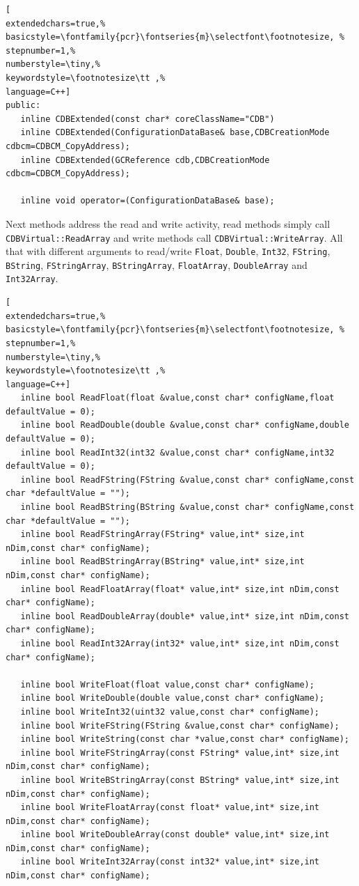 \begin{lstlisting}[
extendedchars=true,%
basicstyle=\fontfamily{pcr}\fontseries{m}\selectfont\footnotesize, %
stepnumber=1,%
numberstyle=\tiny,%
keywordstyle=\footnotesize\tt ,%
language=C++]
public:
   inline CDBExtended(const char* coreClassName="CDB")
   inline CDBExtended(ConfigurationDataBase& base,CDBCreationMode cdbcm=CDBCM_CopyAddress);
   inline CDBExtended(GCReference cdb,CDBCreationMode cdbcm=CDBCM_CopyAddress);

   inline void operator=(ConfigurationDataBase& base);
\end{lstlisting}

Next methods address the read and write activity, read methods simply call \texttt{CDBVirtual::ReadArray} and write methods call \texttt{CDBVirtual::WriteArray}. All that with different arguments to read/write \texttt{Float}, \texttt{Double}, \texttt{Int32}, \texttt{FString}, \texttt{BString}, \texttt{FStringArray}, \texttt{BStringArray}, \texttt{FloatArray}, \texttt{DoubleArray} and \texttt{Int32Array}.
\begin{lstlisting}[
extendedchars=true,%
basicstyle=\fontfamily{pcr}\fontseries{m}\selectfont\footnotesize, %
stepnumber=1,%
numberstyle=\tiny,%
keywordstyle=\footnotesize\tt ,%
language=C++]
   inline bool ReadFloat(float &value,const char* configName,float defaultValue = 0);
   inline bool ReadDouble(double &value,const char* configName,double defaultValue = 0);
   inline bool ReadInt32(int32 &value,const char* configName,int32 defaultValue = 0);
   inline bool ReadFString(FString &value,const char* configName,const char *defaultValue = "");
   inline bool ReadBString(BString &value,const char* configName,const char *defaultValue = "");
   inline bool ReadFStringArray(FString* value,int* size,int nDim,const char* configName);
   inline bool ReadBStringArray(BString* value,int* size,int nDim,const char* configName);
   inline bool ReadFloatArray(float* value,int* size,int nDim,const char* configName);
   inline bool ReadDoubleArray(double* value,int* size,int nDim,const char* configName);
   inline bool ReadInt32Array(int32* value,int* size,int nDim,const char* configName);

   inline bool WriteFloat(float value,const char* configName);
   inline bool WriteDouble(double value,const char* configName);
   inline bool WriteInt32(uint32 value,const char* configName);
   inline bool WriteFString(FString &value,const char* configName);
   inline bool WriteString(const char *value,const char* configName);
   inline bool WriteFStringArray(const FString* value,int* size,int nDim,const char* configName);
   inline bool WriteBStringArray(const BString* value,int* size,int nDim,const char* configName);
   inline bool WriteFloatArray(const float* value,int* size,int nDim,const char* configName);
   inline bool WriteDoubleArray(const double* value,int* size,int nDim,const char* configName);
   inline bool WriteInt32Array(const int32* value,int* size,int nDim,const char* configName);
\end{lstlisting}

